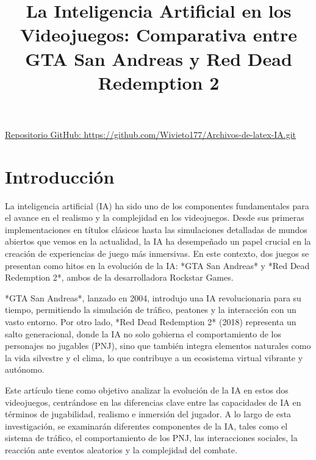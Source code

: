 \documentclass[10pt]{article}
\begin{document}
\noindent



\title{La Inteligencia Artificial en los Videojuegos: Comparativa entre GTA San Andreas y Red Dead Redemption 2}



\maketitle

\noindent
\href{https://github.com/Wivieto177/Archivos-de-latex-IA.git}{Repositorio GitHub: https://github.com/Wivieto177/Archivos-de-latex-IA.git}



\section{Introducción}
La inteligencia artificial (IA) ha sido uno de los componentes fundamentales para el avance en el realismo y la complejidad en los videojuegos. Desde sus primeras implementaciones en títulos clásicos hasta las simulaciones detalladas de mundos abiertos que vemos en la actualidad, la IA ha desempeñado un papel crucial en la creación de experiencias de juego más inmersivas. En este contexto, dos juegos se presentan como hitos en la evolución de la IA: *GTA San Andreas* y *Red Dead Redemption 2*, ambos de la desarrolladora Rockstar Games.

*GTA San Andreas*, lanzado en 2004, introdujo una IA revolucionaria para su tiempo, permitiendo la simulación de tráfico, peatones y la interacción con un vasto entorno. Por otro lado, *Red Dead Redemption 2* (2018) representa un salto generacional, donde la IA no solo gobierna el comportamiento de los personajes no jugables (PNJ), sino que también integra elementos naturales como la vida silvestre y el clima, lo que contribuye a un ecosistema virtual vibrante y autónomo.

Este artículo tiene como objetivo analizar la evolución de la IA en estos dos videojuegos, centrándose en las diferencias clave entre las capacidades de IA en términos de jugabilidad, realismo e inmersión del jugador. A lo largo de esta investigación, se examinarán diferentes componentes de la IA, tales como el sistema de tráfico, el comportamiento de los PNJ, las interacciones sociales, la reacción ante eventos aleatorios y la complejidad del combate.
\end{document}
